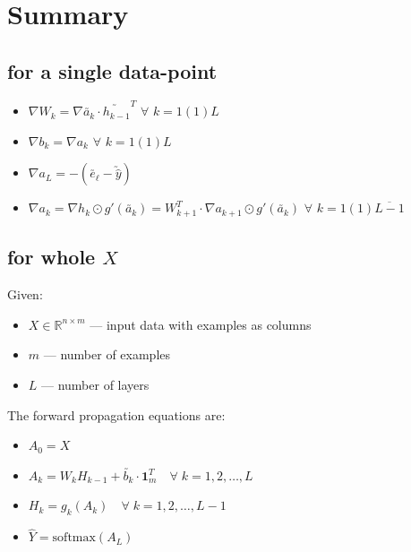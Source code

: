 \documentclass[11pt, a4paper]{article}
\begin{document}
\section{Summary}

\subsection{for a single data-point}


\begin{itemize}

\item $\nabla W_k = \nabla \utilde{a_k} \cdot \utilde{h_{k-1}}^T$ $\forall$ $k = 1(1)L$

\item $\nabla b_k = \nabla a_k$ $\forall$ $k = 1(1)L$

\item $\nabla a_L = - \left( \utilde{e_{\ell}} - \utilde{\hat{y}} \right)$ 

\item $\nabla a_k = \nabla h_k \odot g'(\utilde{a_k}) = W_{k+1}^T \cdot \nabla a_{k+1} \odot g'(\utilde{a_k})$ $\forall$ $k = 1(1)\overline{L-1}$

\end{itemize}

\newpage

\subsection{for whole $X$}

Given:
\begin{itemize}
    \item \( X \in \mathbb{R}^{n \times m} \) — input data with examples as columns
    \item \( m \) — number of examples
    \item \( L \) — number of layers
\end{itemize}

\noindent The forward propagation equations are:

\begin{itemize}
\item $A_0 = X$

\item $A_k = W_k H_{k-1} + \utilde{b_k} \cdot \mathbf{1}_m^T \quad \forall \; k = 1, 2, \dots, L $


\item $H_k = g_k(A_k) \quad \forall \; k = 1, 2, \dots, L-1$

\item $\hat{Y} = \text{softmax}(A_L)$
\end{itemize}
\end{document}
